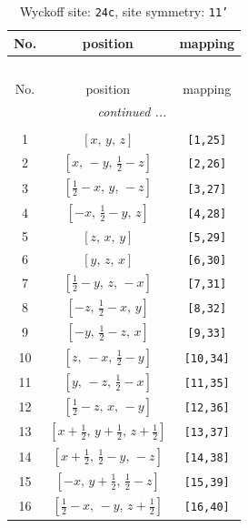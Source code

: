 \documentclass[fleqn,8pt]{jsarticle}
\begin{document}
\begin{longtable}{ccc}
\caption{Wyckoff site: {\tt 24c}, site symmetry: {\tt 11'}}
 \\
 \hline \hline
No. & position & mapping \\ \hline \endfirsthead

\multicolumn{2}{l}{\tablename\ \thetable{}} \\
 \hline \hline
No. & position & mapping \\ \hline \endhead

 \hline \hline
\multicolumn{2}{r}{\footnotesize\it continued ...} \\ \endfoot

 \hline \hline
\multicolumn{2}{r}{} \\ \endlastfoot

1 & $\left[ x,\, y,\, z \right]$ & {\tt [1,25]} \\ \hline
2 & $\left[ x,\, - y,\, \frac{1}{2} - z \right]$ & {\tt [2,26]} \\ \hline
3 & $\left[ \frac{1}{2} - x,\, y,\, - z \right]$ & {\tt [3,27]} \\ \hline
4 & $\left[ - x,\, \frac{1}{2} - y,\, z \right]$ & {\tt [4,28]} \\ \hline
5 & $\left[ z,\, x,\, y \right]$ & {\tt [5,29]} \\ \hline
6 & $\left[ y,\, z,\, x \right]$ & {\tt [6,30]} \\ \hline
7 & $\left[ \frac{1}{2} - y,\, z,\, - x \right]$ & {\tt [7,31]} \\ \hline
8 & $\left[ - z,\, \frac{1}{2} - x,\, y \right]$ & {\tt [8,32]} \\ \hline
9 & $\left[ - y,\, \frac{1}{2} - z,\, x \right]$ & {\tt [9,33]} \\ \hline
10 & $\left[ z,\, - x,\, \frac{1}{2} - y \right]$ & {\tt [10,34]} \\ \hline
11 & $\left[ y,\, - z,\, \frac{1}{2} - x \right]$ & {\tt [11,35]} \\ \hline
12 & $\left[ \frac{1}{2} - z,\, x,\, - y \right]$ & {\tt [12,36]} \\ \hline
13 & $\left[ x + \frac{1}{2},\, y + \frac{1}{2},\, z + \frac{1}{2} \right]$ & {\tt [13,37]} \\ \hline
14 & $\left[ x + \frac{1}{2},\, \frac{1}{2} - y,\, - z \right]$ & {\tt [14,38]} \\ \hline
15 & $\left[ - x,\, y + \frac{1}{2},\, \frac{1}{2} - z \right]$ & {\tt [15,39]} \\ \hline
16 & $\left[ \frac{1}{2} - x,\, - y,\, z + \frac{1}{2} \right]$ & {\tt [16,40]} \\ \hline

\end{longtable}
\end{document}
